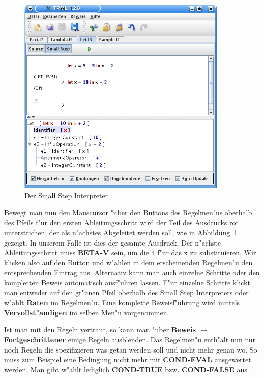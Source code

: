 \begin{figure}[h]
\begin{center}
\includegraphics[width=10cm]{images/small-step.png}
\caption{Der Small Step Interpreter}
\label{FigureSmallStep}
\end{center}
\end{figure}

Bewegt man nun den Mauscursor "uber den Buttons des Regelmen"us
oberhalb des Pfeils f"ur den ersten Ableitungsschritt wird der Teil
des Ausdrucks rot unterstrichen, der als n"achstes Abgeleitet werden
soll, wie in Abbildung~\ref{FigureSmallStep} gezeigt.
In unserem Falle ist dies der gesamte Ausdruck. Der n"achste
Ableitungsschritt muss {\bf BETA-V} sein, um die 4 f"ur das x zu
substituieren. Wir klicken also auf den Button und w"ahlen in dem
erscheinenden Regelmen"u den entsprechenden Eintrag aus. Alternativ
kann man auch einzelne Schritte oder den kompletten Beweis
automatisch ausf"uhren lassen. F"ur einzelne Schritte klickt man
entweder auf den gr"unen Pfeil oberhalb des Small Step Interpreters
oder w"ahlt {\bf Raten} im Regelmen"u. Eine komplette Beweisf"uhrung
wird mittels {\bf Vervollst"andigen} im selben Men"u vorgenommen.

Ist man mit den Regeln vertraut, so kann man "uber {\bf Beweis}
$\rightarrow$ {\bf Fortgeschrittener} einige Regeln ausblenden. Das
Regelmen"u enth"alt nun nur noch Regeln die spezifizieren was getan
werden soll und nicht mehr genau wo. So muss zum Beispiel eine
Bedingung nicht mehr mit {\bf COND-EVAL} ausgewertet werden. Man
gibt w"ahlt lediglich {\bf COND-TRUE} bzw. {\bf COND-FALSE} aus.

